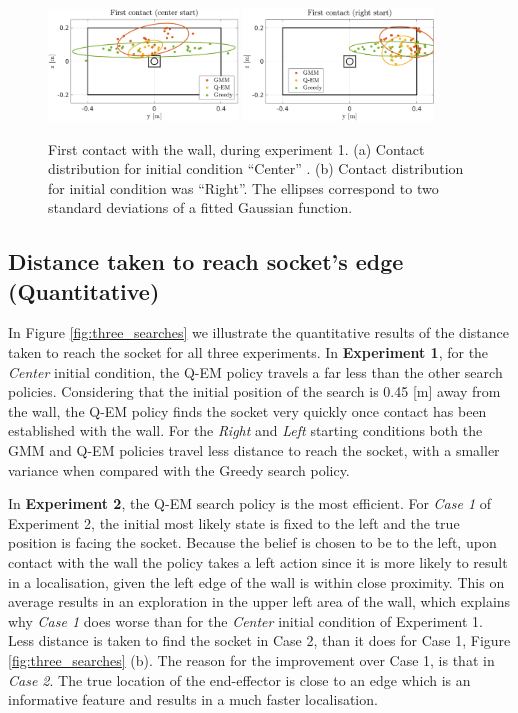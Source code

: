 \begin{figure}
  \centering
   \includegraphics[width=0.45\textwidth]{./ch4-PiH/Figures/Results1/first_contact_center.pdf}
   \includegraphics[width=0.45\textwidth]{./ch4-PiH/Figures/Results1/first_contact_right.pdf}
   \caption{First contact with the wall, during experiment 1. (a) Contact distribution for initial condition ``Center'' . (b) 
   Contact distribution for initial condition was ``Right''. The ellipses correspond to two standard deviations of a fitted Gaussian 
   function.}
   \label{fig:first_contact}
\end{figure}

\subsection{Distance taken to reach socket's edge (Quantitative)}

In Figure \ref{fig:three_searches} we illustrate the quantitative results of the distance taken 
to reach the socket for all three experiments. In \textbf{Experiment 1}, for the \textit{Center} initial condition,
the Q-EM policy travels a far less than the other search policies. Considering that the initial position of the search is 
0.45 [m] away from the wall, the Q-EM policy finds the socket very quickly once contact has been established with the wall. 
For the \textit{Right} and \textit{Left} starting conditions both the GMM and Q-EM policies travel less distance to reach the socket, with a 
smaller variance when compared with the Greedy search policy.

In \textbf{Experiment 2}, the Q-EM search policy is the most efficient. For \textit{Case 1} of Experiment 2, the initial most 
likely state is fixed to the left and the true position is facing the socket. Because the belief is chosen to be 
to the left, upon contact with the wall the policy takes a left action since it is more likely to result in a localisation, given 
the left edge of the wall is within close proximity. 
This on average results in an exploration in the upper left area of the wall, which explains why \textit{Case 1} does worse than 
for the \textit{Center} initial condition of Experiment 1. Less distance is taken to find the socket in Case 2, than it does for Case 1, 
Figure \ref{fig:three_searches} (b). The reason for the improvement over Case 1, is that in \textit{Case 2}. The true location of 
the end-effector is close to an edge which is an informative feature and results in a much faster localisation.

